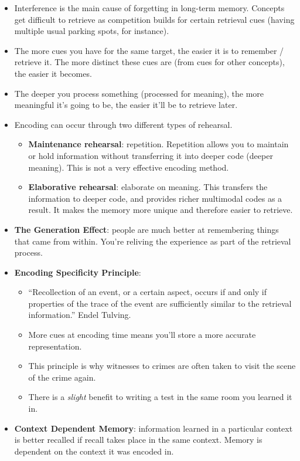 \documentclass[]{article}
\begin{document}
\begin{itemize}
				\item Interference is the main cause of forgetting in long-term memory. Concepts get difficult to retrieve as competition builds for certain retrieval cues (having multiple usual parking spots, for instance).
				\item The more cues you have for the same target, the easier it is to remember / retrieve it. The more distinct these cues are (from cues for other concepts), the easier it becomes.
				\item The deeper you process something (processed for meaning), the more meaningful it's going to be, the easier it'll be to retrieve later.
				\item Encoding can occur through two different types of rehearsal.
					\begin{itemize}
						\item \textbf{Maintenance rehearsal}: repetition. Repetition allows you to maintain or hold information without transferring it into deeper code (deeper meaning). This is not a very effective encoding method.
						\item \textbf{Elaborative rehearsal}: elaborate on meaning. This transfers the information to deeper code, and provides richer multimodal codes as a result. It makes the memory more unique and therefore easier to retrieve.
					\end{itemize}
				\item \textbf{The Generation Effect}: people are much better at remembering things that came from within. You're reliving the experience as part of the retrieval process.
				\item \textbf{Encoding Specificity Principle}:
					\begin{itemize}
						\item ``Recollection of an event, or a certain aspect, occurs if and only if properties of the trace of the event are sufficiently similar to the retrieval information.'' \textendash Endel Tulving.
						\item More cues at encoding time means you'll store a more accurate representation.
						\item This principle is why witnesses to crimes are often taken to visit the scene of the crime again.
						\item There is a \emph{slight} benefit to writing a test in the same room you learned it in. 
					\end{itemize}
				\item \textbf{Context Dependent Memory}: information learned in a particular context is better recalled if recall takes place in the same context. Memory is dependent on the context it was encoded in.

\end{itemize}
\end{document}
